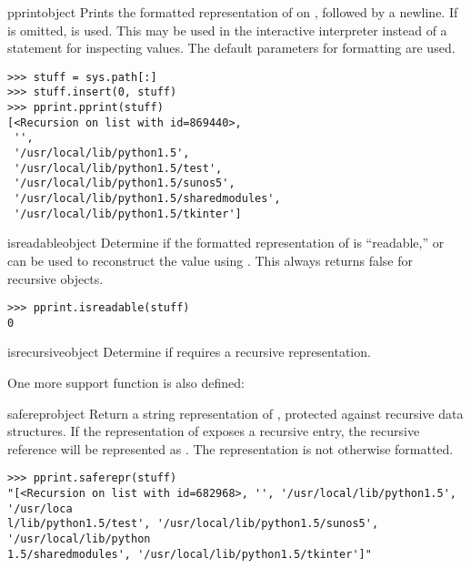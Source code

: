 \begin{funcdesc}{pprint}{object}
Prints the formatted representation of  on ,
followed by a newline.  If  is omitted, 
is used.  This may be used in the interactive interpreter instead of a
 statement for inspecting values.  The default
parameters for formatting are used.

\begin{verbatim}
>>> stuff = sys.path[:]
>>> stuff.insert(0, stuff)
>>> pprint.pprint(stuff)
[<Recursion on list with id=869440>,
 '',
 '/usr/local/lib/python1.5',
 '/usr/local/lib/python1.5/test',
 '/usr/local/lib/python1.5/sunos5',
 '/usr/local/lib/python1.5/sharedmodules',
 '/usr/local/lib/python1.5/tkinter']
\end{verbatim}
\end{funcdesc}

\begin{funcdesc}{isreadable}{object}
Determine if the formatted representation of  is
``readable,'' or can be used to reconstruct the value using
.  This always returns false for
recursive objects.

\begin{verbatim}
>>> pprint.isreadable(stuff)
0
\end{verbatim}
\end{funcdesc}

\begin{funcdesc}{isrecursive}{object}
Determine if  requires a recursive representation.
\end{funcdesc}


One more support function is also defined:

\begin{funcdesc}{saferepr}{object}
Return a string representation of , protected against
recursive data structures.  If the representation of 
exposes a recursive entry, the recursive reference will be represented
as .  The
representation is not otherwise formatted.
\end{funcdesc}

\begin{verbatim}
>>> pprint.saferepr(stuff)
"[<Recursion on list with id=682968>, '', '/usr/local/lib/python1.5', '/usr/loca
l/lib/python1.5/test', '/usr/local/lib/python1.5/sunos5', '/usr/local/lib/python
1.5/sharedmodules', '/usr/local/lib/python1.5/tkinter']"
\end{verbatim}


